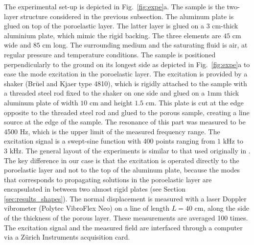 The experimental set-up is depicted in Fig.~\ref{fig:expe}a. The sample is the two-layer structure considered in the previous subsection. The aluminum plate is glued on top of the poroelastic layer. The latter layer is glued on a $3\textrm{ cm}$-thick aluminium plate, which mimic the rigid backing. The three elements are $45\textrm{ cm}$ wide and $85 \textrm{ cm}$ long. The surrounding medium and the saturating fluid is air, at regular pressure and temperature conditions. The sample is positioned perpendicularly to the ground on its longest side as depicted in Fig.~\ref{fig:expe}a to ease the mode excitation in the poroelastic layer. The excitation is provided by a shaker (Brüel and Kjaer type 4810), which is rigidly attached to the sample with a threaded steel rod fixed to the shaker on one side and glued on a $1 \textrm{mm}$ thick aluminum plate of width $10 \textrm{ cm}$ and height $1.5 \textrm{ cm}$. This plate is cut at the edge opposite to the threaded steel rod and glued to the porous sample, creating a line source at the edge of the sample. The resonance of this part was measured to be 4500 Hz, which is the upper limit of the measured frequency range. The excitation signal is a swept-sine function with 400 points ranging from $1 \textrm{ kHz}$ to $3 \textrm{ kHz}$. The general layout of the experiments is similar to that used originally in \cite{geslain2016}. The key difference in our case is that the excitation is operated directly to the poroelastic layer and not to the top of the aluminum plate, because the modes that corresponds to propagating solutions in the poroelastic layer are encapsulated in between two almost rigid plates (see Section \ref{sec:results_shapes}). The normal displacement is measured with a laser Doppler vibrometer (Polytec VibroFlex Neo) on a line of length $L = 40$ cm, along the side of the thickness of the porous layer. These measurements are averaged 100 times. The excitation signal and the measured field are interfaced through a computer via a Zürich Instruments acquisition card. 

